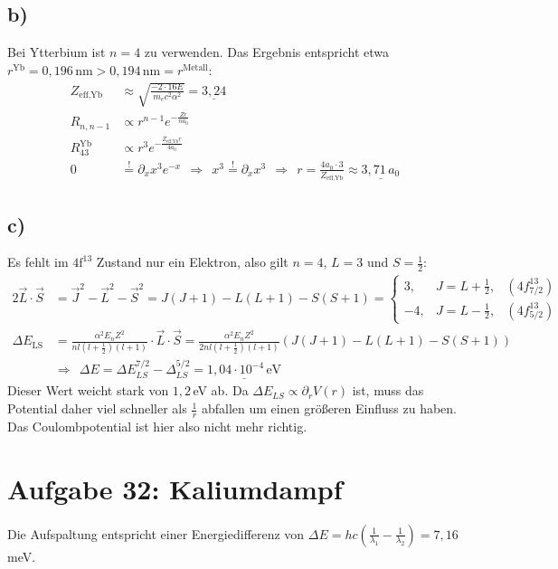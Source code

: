 \documentclass[a4paper,12pt]{article}
\newcommand{\kla}{}
\newcommand{\tecxt}{}
\begin{document}
\subsection*{b)}
Bei Ytterbium ist $n=4$ zu verwenden. Das Ergebnis entspricht etwa $r^\tecxt\text{Yb}=0,196\,\tecxt\text{nm}>0,194\,\tecxt\text{nm}=r^\tecxt\text{Metall}$:
\begin{align*}
Z_\tecxt\text{eff,Yb}&\approx\sqrt{\frac{-2\cdot 16E}{m_ec^2\alpha^2}}=\underline{3,24}\\
R_{n,n-1}&\propto r^{n-1}e^{-\frac{Zr}{na_0}} \\
R_{43}^\tecxt\text{Yb}&\propto r^3e^{-\frac{Z_\tecxt\text{eff,Yb}r}{4a_0}}\\
0&\overset{!}{=}\partial_x x^3e^{-x}\ \ \Rightarrow\ \ x^3\overset{!}{=}\partial_x x^3\ \ \Rightarrow\ \ r=\frac{4a_0\cdot 3}{Z_\tecxt\text{eff,Yb}}\approx\underline{3,71\,a_0}
\end{align*}
\subsection*{c)}
Es fehlt im $4\tecxt\text{f}^{13}$ Zustand nur ein Elektron, also gilt $n=4$, $L=3$ und $S=\frac{1}{2}$:
\begin{align*}
2\vec{L}\cdot\vec{S}&=\vec{J}^2-\vec{L}^2-\vec{S}^2=J(J+1)-L(L+1)-S(S+1)=\left\{\begin{matrix}
3,&J=L+\frac{1}{2}, &(4f_{7/2}^{13})\\ -4,&J=L-\frac{1}{2},&(4f_{5/2}^{13})
\end{matrix}\right.\\
\Delta E_\tecxt\text{LS}&=\frac{\alpha^2E_nZ^2}{nl(l+\frac{1}{2})(l+1)}\cdot\vec{L}\cdot\vec{S}=\frac{\alpha^2E_nZ^2}{2nl\kla\left( {l+\frac{1}{2}} \right)(l+1)}\kla\left( {J(J+1)-L(L+1)-S(S+1)} \right)\\
&\Rightarrow\ \ \Delta E=\Delta E_{LS}^{7/2}-\Delta_{LS}^{5/2}=\underline{1,04\cdot 10^{-4}\,\tecxt\text{eV}}
\end{align*} 
Dieser Wert weicht stark von $1,2$\,eV ab. Da $\Delta E_{LS}\propto\partial_rV(r)$ ist, muss das Potential daher viel schneller als $\frac{1}{r}$ abfallen um einen größeren Einfluss zu haben. Das Coulombpotential ist hier also nicht mehr richtig.
\section*{Aufgabe 32: Kaliumdampf}
Die Aufspaltung entspricht einer Energiedifferenz von $\Delta E=hc\kla\left( {\frac{1}{\lambda_1}-\frac{1}{\lambda_2}} \right)=7,16\,$meV.
\end{document}

